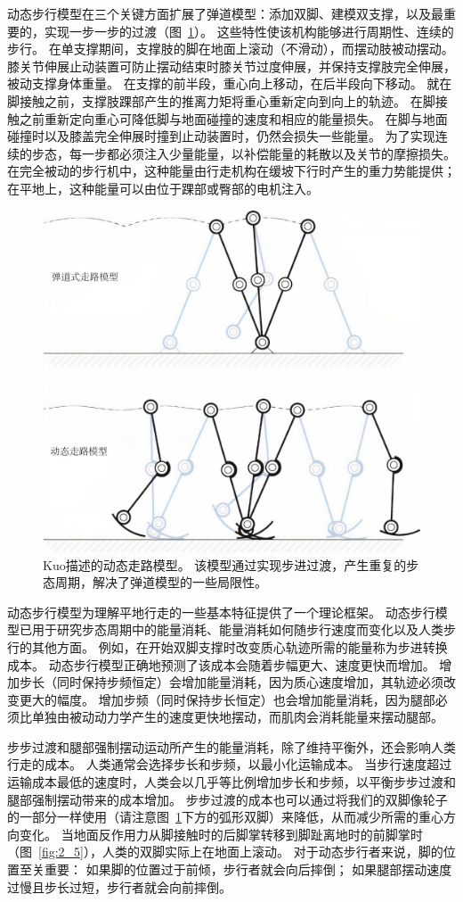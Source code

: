 动态步行模型在三个关键方面扩展了弹道模型：添加双脚、建模双支撑，以及最重要的，实现一步一步的过渡（图~\ref{fig:2_14}）。
这些特性使该机构能够进行周期性、连续的步行。
在单支撑期间，支撑肢的脚在地面上滚动（不滑动），而摆动肢被动摆动。
膝关节伸展止动装置可防止摆动结束时膝关节过度伸展，并保持支撑肢完全伸展，被动支撑身体重量。
在支撑的前半段，重心向上移动，在后半段向下移动。
就在脚接触之前，支撑肢踝部产生的推离力矩将重心重新定向到向上的轨迹。
在脚接触之前重新定向重心可降低脚与地面碰撞的速度和相应的能量损失。
在脚与地面碰撞时以及膝盖完全伸展时撞到止动装置时，仍然会损失一些能量。
为了实现连续的步态，每一步都必须注入少量能量，以补偿能量的耗散以及关节的摩擦损失。
在完全被动的步行机中，这种能量由行走机构在缓坡下行时产生的重力势能提供；
在平地上，这种能量可以由位于踝部或臀部的电机注入。


\begin{figure}[!htb]
	\centering
	\includegraphics[width=0.6\linewidth]{chap2/2_14}
	\caption{Kuo\cite{kuo2010dynamic}描述的动态走路模型。
		该模型通过实现步进过渡，产生重复的步态周期，解决了弹道模型的一些局限性。 \label{fig:2_14}}
\end{figure}


动态步行模型为理解平地行走的一些基本特征提供了一个理论框架。
动态步行模型已用于研究步态周期中的能量消耗、能量消耗如何随步行速度而变化以及人类步行的其他方面。
例如，在开始双脚支撑时改变质心轨迹所需的能量称为步进转换成本。
动态步行模型正确地预测了该成本会随着步幅更大、速度更快而增加。
增加步长（同时保持步频恒定）会增加能量消耗，因为质心速度增加，其轨迹必须改变更大的幅度。
增加步频（同时保持步长恒定）也会增加能量消耗，因为腿部必须比单独由被动动力学产生的速度更快地摆动，而肌肉会消耗能量来摆动腿部。


步步过渡和腿部强制摆动运动所产生的能量消耗，除了维持平衡外，还会影响人类行走的成本。
人类通常会选择步长和步频，以最小化运输成本。
当步行速度超过运输成本最低的速度时，人类会以几乎等比例增加步长和步频，以平衡步步过渡和腿部强制摆动带来的成本增加。
步步过渡的成本也可以通过将我们的双脚像轮子的一部分一样使用（请注意图~\ref{fig:2_14}下方的弧形双脚）来降低，从而减少所需的重心方向变化。
当地面反作用力从脚接触时的后脚掌转移到脚趾离地时的前脚掌时（图~\ref{fig:2_5}），人类的双脚实际上在地面上滚动。
对于动态步行者来说，脚的位置至关重要：
如果脚的位置过于前倾，步行者就会向后摔倒；
如果腿部摆动速度过慢且步长过短，步行者就会向前摔倒。



